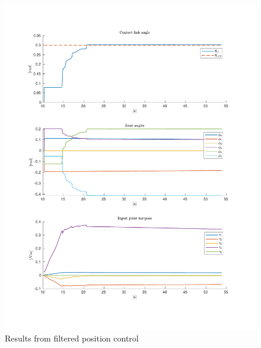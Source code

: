 \begin{figure}
    \centering
    
    \includegraphics[trim=2cm 2cm 2cm 2cm, clip=true, width=\textwidth]{figures/experiments/single_pos/single-pos-3plot.pdf}

    \caption{Results from filtered position control}
    \label{fig:singlepos}
\end{figure}

